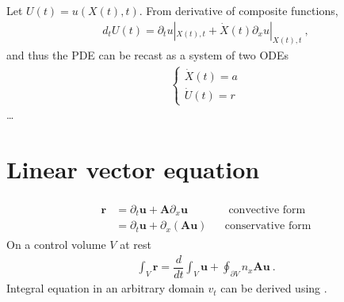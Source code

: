 \documentclass[letterpaper,10pt,english]{jupyterBook}
\begin{document}
\sphinxAtStartPar
{} Let \(U(t) = u(X(t), t)\). From derivative of composite functions,
\begin{equation*}
\begin{split}d_t U(t) = \partial_t u|_{X(t),t} + \dot{X}(t) \partial_x u|_{X(t),t} \ ,\end{split}
\end{equation*}
\sphinxAtStartPar
and thus the PDE can be recast as a system of two ODEs
\begin{equation*}
\begin{split}\begin{cases}
  \dot{X}(t) = a \\
  \dot{U}(t) = r
\end{cases}\end{split}
\end{equation*}
\sphinxAtStartPar
…

\sphinxstepscope


\section{Linear vector equation}
\label{\detokenize{ch/pde/hyperbolic-1d-vector-linear:linear-vector-equation}}\label{\detokenize{ch/pde/hyperbolic-1d-vector-linear:pde-hyperbolic-problems-1d-vector-linear}}\label{\detokenize{ch/pde/hyperbolic-1d-vector-linear::doc}}
\sphinxAtStartPar
{}
\begin{equation*}
\begin{split}\begin{aligned}
  \mathbf{r}
  & = \partial_t \mathbf{u} + \mathbf{A} \partial_x \mathbf{u}                 && \text{  convective form} \\
  & = \partial_t \mathbf{u} + \partial_x \left( \mathbf{A} \mathbf{u} \right)  && \text{conservative form} 
\end{aligned}\end{split}
\end{equation*}
\sphinxAtStartPar
{} On a control volume \(V\) at rest
\begin{equation*}
\begin{split}\int_{V} \mathbf{r} = \dfrac{d}{dt} \int_V \mathbf{u} + \oint_{\partial V} n_x \mathbf{A} \mathbf{u} \ .\end{split}
\end{equation*}
\sphinxAtStartPar
Integral equation in an arbitrary domain \(v_t\) can be derived using {\hyperref[\detokenize{ch/tensor-algebra-calculus/time-derivative-of-integrals:tensor-calculus-time-derivative-of-integrals-volume-density}]{}}.
\end{document}
